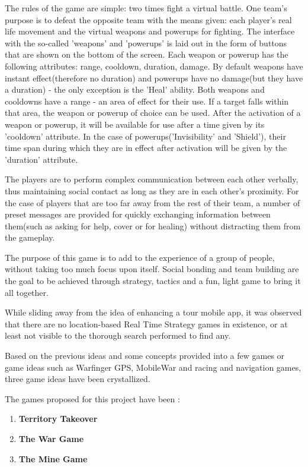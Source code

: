 The rules of the game are simple: two times fight a virtual battle. One team's
purpose is to defeat the opposite team with the means given: each player's real
life movement and the virtual weapons and powerups for fighting. The interface
with the so-called 'weapons' and 'powerups' is laid out in the form of buttons
that are shown on the bottom of the screen. Each weapon or powerup has the
following attributes: range, cooldown, duration, damage. By default weapons have
instant effect(therefore no duration) and powerups have no damage(but they have
a duration) - the only exception is the 'Heal' ability. Both weapons and
cooldowns have a range - an area of effect for their use. If a target falls
within that area, the weapon or powerup of choice can be used. After the
activation of a weapon or powerup, it will be available for use after a time
given by its 'cooldown' attribute. In the case of powerups('Invisibility' and
'Shield'), their time span during which they are in effect after activation will
be given by the 'duration' attribute. \newline

The players are to perform complex communication between each other verbally,
thus maintaining social contact as long as they are in each other's proximity.
For the case of players that are too far away from the rest of their team, a
number of preset messages are provided for quickly exchanging information
between them(such as asking for help, cover or for healing) without distracting
them from the gameplay.\newline

The purpose of this game is to add to the experience of a group of people,
without taking too much focus upon itself. Social bonding and team building are
the goal to be achieved through strategy, tactics and a fun, light game to bring
it all together.\newline

While sliding away from the idea of enhancing a tour mobile app, it was observed
that there are no location-based Real Time Strategy games in existence, or at
least not visible to the thorough search performed to find any.\newline

Based on the previous ideas and some concepts provided into a few games or game
ideas such as Warfinger GPS, MobileWar and racing and navigation games, three
game ideas have been crystallized.\newline 

The games proposed for this project have been :
\begin{enumerate}	
	\item \textbf{Territory Takeover}
	\item \textbf{The War Game}
	\item \textbf{The Mine Game}
\end{enumerate}

